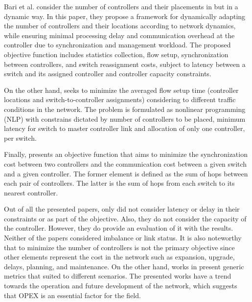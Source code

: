 \documentclass{IEEEtran}
\begin{document}
Bari et al. consider the number of controllers and their placements in \cite{BaRo13} but in a dynamic way. %
In this paper, they propose a framework for dynamically adapting the number of controllers and their locations according to network dynamics, while ensuring minimal processing delay and communication overhead at the controller due to synchronization and management workload. The proposed objective function includes statistics collection, flow setup, synchronization between controllers, and switch reassignment costs, subject to latency between a switch and its assigned controller and controller capacity constraints. 

On the other hand, \cite{HeBa17} seeks to minimize the averaged flow setup time (controller locations and switch-to-controller assignments) considering to different traffic conditions in the network. The problem is formulated as nonlinear programming (NLP) with constrains dictated by number of controllers to be placed, minimum latency for switch to master controller link and allocation of only one controller, per switch. %

Finally, \cite{SuHa17} presents an objective function that aims to minimize the synchronization cost between two controllers and the communication cost between a given switch and a given controller. The former element is defined as the sum of hops between each pair of controllers. The latter is the sum of hops from each switch to its nearest controller. 


Out of all the presented papers, only  \cite{RoRu16, SuHa17} did not consider latency or delay in their constraints or as part of the objective. Also, they do not consider the capacity of the controller.  However, they do provide an evaluation of it with the results. Neither of the papers considered imbalance or link status. It is  also noteworthy that to minimize the number of controllers is not the primary objective since other elements represent the cost in the network such as expansion, upgrade, delays, planning, and maintenance. On the other hand, works in \cite{YaHo15, 11-BaRo13, SuHa17, HeBa17} present generic metrics that suited to different scenarios. The presented works have a trend towards the operation and future development of the network, which suggests that OPEX is an essential factor for the field.   
\end{document}
